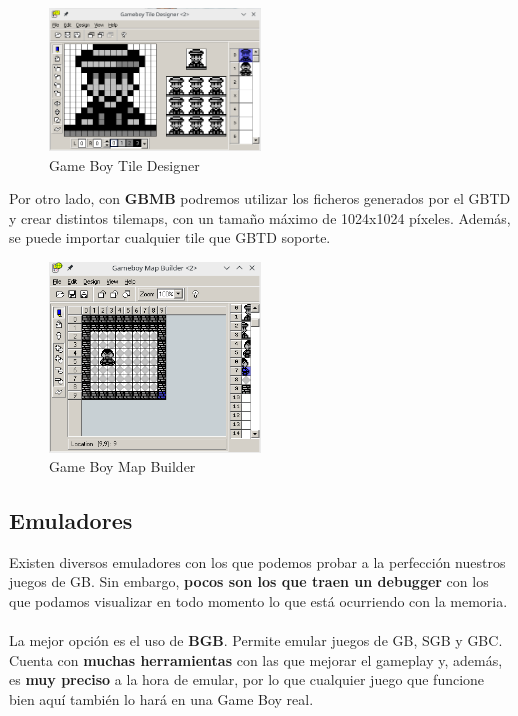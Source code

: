 \begin{figure}[h]
\centering
\includegraphics[width=0.5\textwidth]{include/images/manual/gbtd.png}
\caption{Game Boy Tile Designer}
\label{figure:gbtd}
\end{figure}

Por otro lado, con \textbf{GBMB} podremos utilizar los ficheros generados por el GBTD y crear distintos tilemaps, con un tamaño máximo de 1024x1024 píxeles. Además, se puede importar cualquier tile que GBTD soporte.

\begin{figure}[h]
\centering
\includegraphics[width=0.5\textwidth]{include/images/manual/gbmb.png}
\caption{Game Boy Map Builder}
\label{figure:gbmb}
\end{figure}

\clearpage

\subsection{Emuladores}

Existen diversos emuladores con los que podemos probar a la perfección nuestros juegos de GB. Sin embargo, \textbf{pocos son los que traen un debugger} con los que podamos visualizar en todo momento lo que está ocurriendo con la memoria.
\\ \\
La mejor opción es el uso de \textbf{BGB}. Permite emular juegos de GB, SGB y GBC. Cuenta con \textbf{muchas herramientas} con las que mejorar el gameplay y, además, es \textbf{muy preciso} a la hora de emular, por lo que cualquier juego que funcione bien aquí también lo hará en una Game Boy real.

